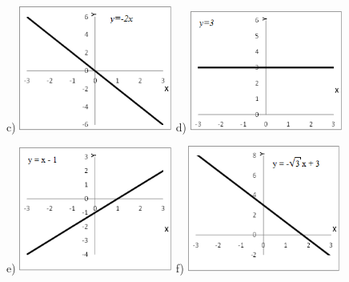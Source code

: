 \begin{respostas}{3}
\begin{figure}[H]
	c) \includegraphics[width=0.45\textwidth]{capitulos/funcao_do_primeiro_grau/media/image51.png} 
	d) \includegraphics[width=0.45\textwidth]{capitulos/funcao_do_primeiro_grau/media/image52.png}
\end{figure}

\begin{figure}[H]
	e) \includegraphics[width=0.45\textwidth]{capitulos/funcao_do_primeiro_grau/media/image53.png} 
	f) \includegraphics[width=0.45\textwidth]{capitulos/funcao_do_primeiro_grau/media/image54.png}
\end{figure}


\end{respostas}
